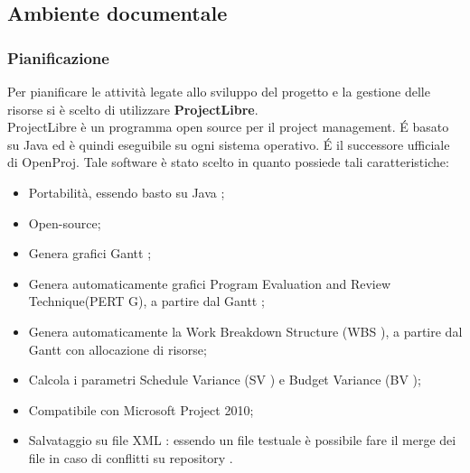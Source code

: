 \documentclass[a4paper,12pt]{article}
\begin{document}
\subsection{Ambiente documentale}
{
\subsubsection{Pianificazione} 
{
Per pianificare le attività legate allo sviluppo del progetto e la gestione delle risorse si 
è scelto di utilizzare \textbf{ProjectLibre}.\\
ProjectLibre è un programma open source per il project management. É basato su 
Java  ed è quindi eseguibile su ogni sistema operativo. É il successore ufficiale di 
OpenProj. Tale software è stato scelto in quanto possiede tali caratteristiche: 
\begin{itemize}
\item Portabilità, essendo basto su Java  ; 
\item Open-source; 
\item Genera grafici Gantt  ; 
\item Genera automaticamente grafici Program Evaluation and Review Technique(PERT G), 
a partire dal Gantt  ; 
\item Genera automaticamente la Work Breakdown Structure  (WBS  ), a partire dal 
Gantt  con allocazione di risorse; 
\item Calcola i parametri Schedule Variance  (SV ) e Budget Variance (BV ); 
\item Compatibile con Microsoft Project 2010; 
\item Salvataggio su file XML  : essendo un file testuale è possibile fare il merge dei file 
in caso di conflitti su repository  . 
\end{itemize}
}

}
\end{document}
